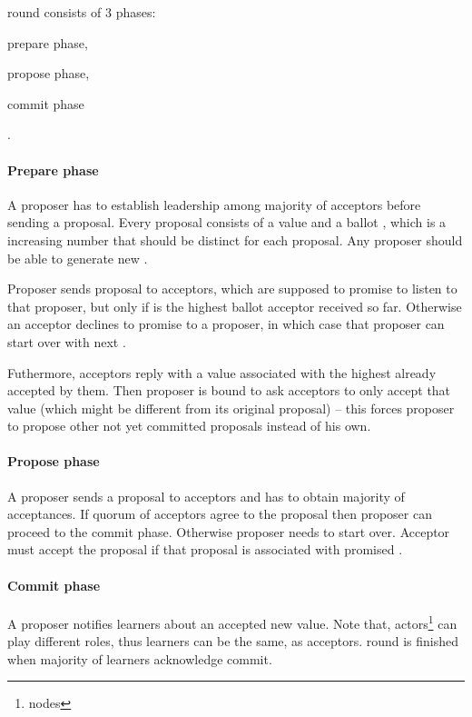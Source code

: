 \paxos round consists of $3$ phases: \begin{enumerate*}[label=\alph*)] \item prepare phase, \item propose phase, \item commit phase \end{enumerate*}.

\paragraph{Prepare phase}
A proposer has to establish leadership among majority of acceptors before sending a proposal. Every proposal consists of a value and a ballot \ballot, which is a increasing number that should be distinct for each proposal. Any proposer should be able to generate new \ballot.

Proposer sends proposal \ballot to acceptors, which are supposed to promise to listen to that proposer, but only if \ballot is the highest ballot acceptor received so far. Otherwise an acceptor declines to promise to a proposer, in which case that proposer can start over with next \ballot. 

Futhermore, acceptors reply with a value associated with the highest \ballot already accepted by them. Then proposer is bound to ask acceptors to only accept that value (which might be different from its original proposal) -- this forces proposer to propose other not yet committed proposals instead of his own.

\paragraph{Propose phase}
A proposer sends a proposal to acceptors and has to obtain majority of acceptances. If quorum of acceptors agree to the proposal then proposer can proceed to the commit phase. Otherwise proposer needs to start over. Acceptor must accept the proposal if that proposal is associated with promised \ballot.

\paragraph{Commit phase}
A proposer notifies learners about an accepted new value. Note that, actors\footnote{nodes} can play different roles, thus learners can be the same, as acceptors. \paxos round is finished when majority of learners acknowledge commit.



